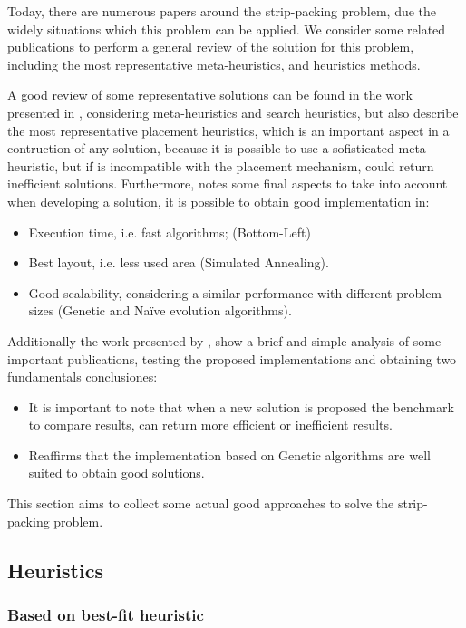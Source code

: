 Today, there are numerous papers around the strip-packing problem,
due the widely situations which this problem can be applied.
We consider some related publications to perform a general review
of the solution for this problem, including the most representative
meta-heuristics, and heuristics methods.

A good review of some representative solutions can be found in the work
presented in \cite{hooper}, considering meta-heuristics and search heuristics,
but also describe the most representative placement heuristics,
which is an important aspect in a contruction of any solution,
because it is possible to use a sofisticated meta-heuristic,
but if is incompatible with the placement mechanism,
could return inefficient solutions.
Furthermore, \cite{hooper} notes some final aspects to take into account
when developing a solution, it is possible to obtain good implementation in:
\begin{itemize}
    \item Execution time, i.e. fast algorithms; (Bottom-Left)
    \item Best layout, i.e. less used area (Simulated Annealing).
    \item Good scalability, considering a similar performance with different
        problem sizes (Genetic and Naïve evolution algorithms).
\end{itemize}

Additionally the work presented by \cite{riff},
show a brief and simple analysis of some important
publications, testing the proposed implementations
and obtaining two fundamentals conclusiones:
\begin{itemize}
    \item It is important to note that when a new solution is proposed
        the benchmark to compare results, can return more efficient or
        inefficient results.
    \item Reaffirms that the implementation based on Genetic algorithms are well
        suited to obtain good solutions.
\end{itemize}

This section aims to collect some actual good approaches
to solve the strip-packing problem.

\subsection{Heuristics}

\subsubsection{Based on best-fit heuristic}

